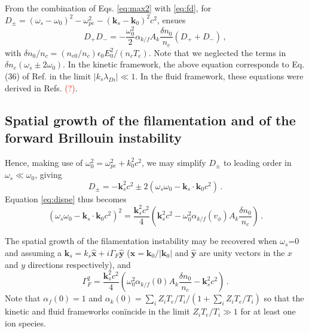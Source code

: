 \documentclass[
 reprint,
 amsmath,amssymb,
 aps,
]{revtex4-1}
\begin{document}
From the combination of  Eqs. \eqref{eq:max2} with \eqref{eq:fd}, 
for $D_\pm= (\omega_s-\omega_0)^2 - \omega_{pe}^2 -( \mathbf{k}_s-\mathbf{k}_0) ^2c^2 $, ensues
\begin{equation}\label{eq:dispe}
    D_+D_- = -\frac{\omega_{0}^2}{2}\alpha_{k/f}A_k\frac{\delta n_0}{n_c} (D_++D_-) \, ,
\end{equation}
with $\delta n_0/n_c = (n_{e0}/n_c) \epsilon_0E_0^2/(n_c T_e)$.
Note that we neglected the terms in $\delta n_e(\omega_s \pm 2\omega_0)$.
In the kinetic framework, the above equation corresponds to Eq. (36) of Ref. \cite[]{POF_Cohen_79} in the limit $\vert k_s \lambda_{Di} \vert \ll 1$. In the fluid framework, these equations were derived in Refs. \cite[]{Kruer,phd_Michel,phd-Grech} \textcolor{red}{(?)}.

\subsection{Spatial growth of the filamentation and of the forward Brillouin instability}
Hence,  making use of $\omega_0^2=\omega_{pe}^2 +k_0^2c^2$, we may simplify $D_\pm$ to leading order in $\omega_s\ll\omega_0$, giving 
\begin{equation}\label{eq:dpm}
D_\pm = -\mathbf{k}_s^2c^2\pm 2(\omega_s\omega_0 - \mathbf{k}_s\cdot\mathbf{k}_0 c^2) \, .
\end{equation} 
Equation \eqref{eq:dispe} thus becomes 
\begin{equation}\label{eq:dispe2} 
(\omega_s\omega_0 - \mathbf{k}_s\cdot\mathbf{k}_0 c^2)^2
=\frac{\mathbf{k}_s^2c^2}{4}\left( \mathbf{k}_s^2c^2 - \omega_{0}^2\alpha_{k/f}(v_\phi)A_k\frac{\delta n_0}{n_c} \right) 
\, .
\end{equation}

The spatial growth of the filamentation instability may be recovered when $\omega_s$=0 and assuming a $\mathbf{k}_s = k_s \hat{\mathbf{x}} +i\Gamma_F \hat{\mathbf{y}}$ ($\hat{\mathbf{x}}=\mathbf{k}_0 /\vert \mathbf{k}_0 \vert $ and  $\hat{\mathbf{y}}$  are unity vectors in the $x$ and $y$ directions respectively), and 
\begin{equation}\label{eq:gf} 
\Gamma_F^2
=\frac{\mathbf{k}_s^2c^2}{4}\left( \omega_{0}^2\alpha_{k/f}(0)A_k\frac{\delta n_0}{n_c}- \mathbf{k}_s^2c^2 \right) 
\, .
\end{equation}
Note that $\alpha_f(0)=1$ and $\alpha_k(0)=\sum_i Z_iT_e/T_i/(1+\sum_i Z_iT_e/T_i)$ so that the kinetic and fluid frameworks con\"incide in the limit $Z_iT_e/T_i\gg 1$ for at least one ion species.
\end{document}
